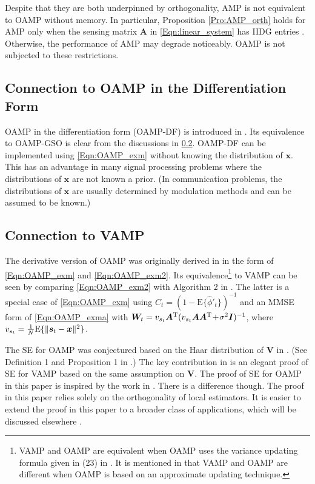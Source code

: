 \documentclass[journal]{IEEEtran}
\newcommand{\mr}{\mathrm}
\renewcommand{\bf}{\bm}
\newcommand{\LL}[1]{\textcolor{black}{#1}}
\begin{document}
Despite that they are both underpinned by orthogonality, AMP is not equivalent to OAMP without memory. \LL{In particular}, Proposition \ref{Pro:AMP_orth} holds for AMP only when the sensing matrix $\bf{A}$ in \eqref{Eqn:linear_system} has IIDG entries \cite{Donoho2009, Bayati2011}. Otherwise, the performance of AMP may degrade noticeably. OAMP is not subjected to these restrictions. %
 
\subsection{Connection to OAMP in the Differentiation Form} \label{Sec:comp_OAMP_DF}
OAMP in the differentiation form (OAMP-DF) is introduced in \cite{Ma2016}. Its equivalence to OAMP-GSO is clear from the discussions in \ref{Sec:comp_other_alg}. OAMP-DF can be implemented using \eqref{Eqn:OAMP_exm} without knowing the distribution of $\bf{x}$. This has an advantage in many signal processing problems where the distributions of $\bf{x}$ are not known a prior. (In communication problems, the distributions of $\bf{x}$ are usually determined by modulation methods and can be assumed to be known.)
 
 
\subsection{Connection to VAMP}\label{Sec:comp_other_alg}
The derivative version of OAMP was originally derived in \cite{Ma2016} in the form of \eqref{Eqn:OAMP_exm} and \eqref{Eqn:OAMP_exm2}. Its equivalence\footnote{VAMP and OAMP are equivalent when OAMP uses the variance updating formula given in (23) in \cite{Ma2016}. It is mentioned in \cite{Rangan2016} that VAMP and OAMP are different when OAMP is based on an approximate updating technique.} to VAMP can be seen by  comparing \eqref{Eqn:OAMP_exm2} with Algorithm 2 in \cite{Rangan2016}. The latter is a special case of \eqref{Eqn:OAMP_exm} using $C_t=(1-\mr{E}\{\hat{\phi}'_t\})^{-1}$ and an MMSE form of \eqref{Eqn:OAMP_exma} with  ${\bf{W}}_t=v_{s_t}\bf{A}^{\rm T}(v_{s_t}\bf{A}\bf{A}^{\rm T} \!+\! \sigma^2\bf{I})^{-1}$, where $v_{s_t}=\frac{1}{N}{\rm E}\{\|\bf{s}_t-\bf{x}\|^2\}$. 

The SE for OAMP was conjectured based on the Haar distribution of $\bf{V}$ in \cite{Ma2016}. (See Definition 1 and Proposition 1 in \cite{Ma2016}.) The key contribution in \cite{Rangan2016} is an elegant proof of SE for VAMP based on the same assumption on $\bf{V}$.  The proof of SE for OAMP in this paper is inspired by the work in \cite{Rangan2016}. There is a difference though. The proof in this paper relies solely on the orthogonality of local estimators. It is easier to extend the proof in this paper to a broader class of applications, which will be discussed elsewhere \cite{Lei_TSP_2_2019}.   
 
\end{document}
